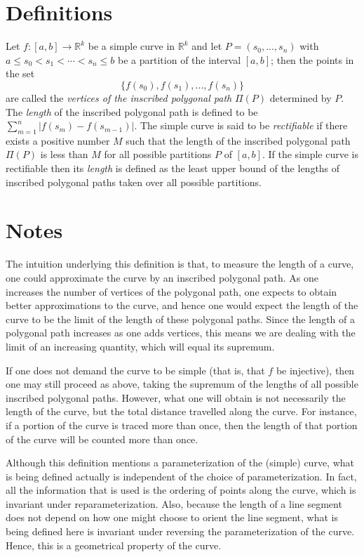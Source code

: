 \documentclass[12pt]{article}
\begin{document}

\section*{Definitions}

Let $f\colon [a,b] \rightarrow \mathbb{R}^k$ be a simple curve in $\mathbb{R}^{k}$ and let $P = (s_{0}, ..., s_{n})$ with $a \le s_0 < s_1 < \cdots < s_n \le b$ be a partition of the interval $[a, b]$; then the points in the set
\[\{ f(s_{0}), f(s_{1}), ..., f(s_{n}) \}\]
are called the \emph{vertices of the inscribed polygonal path} $\Pi(P)$ determined by $P$.
The \emph{length} of the inscribed polygonal path
is defined to be $\sum_{m=1}^n | f(s_{m}) - f(s_{m-1}) |$.
The simple curve is said to be \emph{rectifiable} if there exists a positive number $M$ such that the length of the inscribed polygonal path $\Pi(P)$ is less than $M$ for all possible partitions $P$ of $[a, b]$.
If the simple curve is rectifiable then its \emph{length}
is defined as the least upper bound of the lengths of inscribed polygonal paths taken over all possible partitions.

\section*{Notes}

The intuition underlying this definition is that, to measure the length of a curve, one could approximate the curve by an inscribed polygonal path.  As one increases the number of vertices of the polygonal path, one expects to obtain better approximations to the curve, and hence one would expect the length of the curve to be the limit of the length of these polygonal paths.  Since the length of a polygonal path increases as one adds vertices, this means we are dealing with the limit of an increasing quantity, which will equal its supremum.

If one does not demand the curve to be simple (that is, that $f$ be injective), then one may still proceed as above, taking the supremum of the lengths of all possible inscribed polygonal paths.  However, what one will obtain is not necessarily the length of the curve, but the total distance travelled along the curve.  For instance, if a portion of the curve is traced more than once, then the length of that portion of the curve will be counted more than once.

Although this definition mentions a parameterization of the (simple) curve, what is being defined actually is independent of the choice of parameterization.  In fact, all the information that is used is the ordering of points along the curve, which is invariant under reparameterization.  Also, because the length of a line segment does not depend on how one might choose to orient the line segment, what is being defined here is invariant under reversing the parameterization of the curve.  Hence, this is a geometrical property of the curve.
\end{document}
